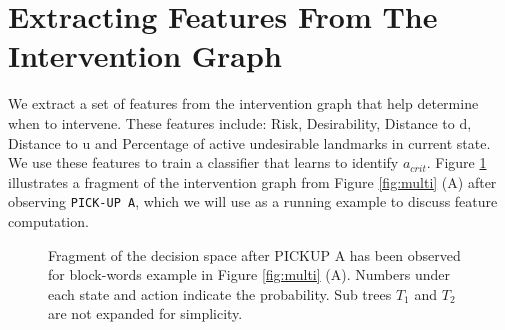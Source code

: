 \documentclass[letterpaper]{article}
\theoremstyle{plain}
\begin{document}
\section{Extracting Features From The Intervention Graph}
\label{sec:features}
We extract a set of features from the intervention graph that help determine when to intervene. These features include: Risk, Desirability, Distance to $\mathrm{d}$, Distance to $\mathrm{u}$ and Percentage of active undesirable landmarks in current state. We use these features to train a classifier that learns to identify $a_{crit}$. Figure \ref{fig:feature} illustrates a fragment of the intervention graph from Figure \ref{fig:multi} (A) after observing \texttt{PICK-UP A}, which we will use as a running example to discuss feature computation.

\begin{figure}[tb]
        \caption{Fragment of the decision space after PICKUP A has been observed for block-words example in Figure \ref{fig:multi} (A). Numbers under each state and action indicate the probability. Sub trees $T_1$ and $T_2$ are not expanded for simplicity.}
        \label{fig:feature}
\end{figure} 
\end{document}
